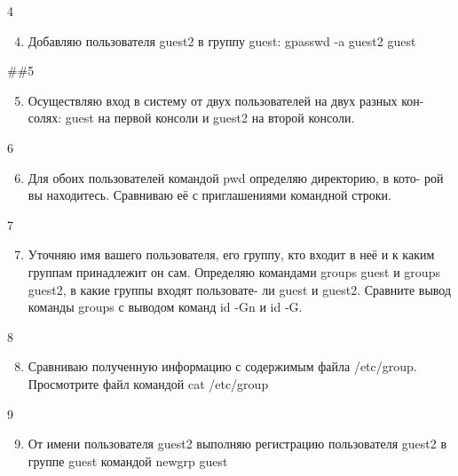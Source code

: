\documentclass[
  ignorenonframetext,
  aspectratio=169,
]{beamer}
\providecommand{\tightlist}{%
  \setlength{\itemsep}{0pt}\setlength{\parskip}{0pt}}\usepackage{longtable,booktabs,array}
\begin{document}
\begin{frame}{4}
\label{section-2}
\begin{enumerate}[<+->]
\setcounter{enumi}{3}
\tightlist
\item
  Добавляю пользователя guest2 в группу guest: gpasswd -a guest2 guest
\end{enumerate}

\#\#5

\begin{enumerate}[<+->]
\setcounter{enumi}{4}
\tightlist
\item
  Осуществляю вход в систему от двух пользователей на двух разных кон-
  солях: guest на первой консоли и guest2 на второй консоли.
\end{enumerate}
\end{frame}

\begin{frame}{6}
\label{section-3}
\begin{enumerate}[<+->]
\setcounter{enumi}{5}
\tightlist
\item
  Для обоих пользователей командой pwd определяю директорию, в кото- рой
  вы находитесь. Сравниваю её с приглашениями командной строки.
\end{enumerate}
\end{frame}

\begin{frame}{7}
\label{section-4}
\begin{enumerate}[<+->]
\setcounter{enumi}{6}
\tightlist
\item
  Уточняю имя вашего пользователя, его группу, кто входит в неё и к
  каким группам принадлежит он сам. Определяю командами groups guest и
  groups guest2, в какие группы входят пользовате- ли guest и guest2.
  Сравните вывод команды groups с выводом команд id -Gn и id -G.
\end{enumerate}
\end{frame}

\begin{frame}{8}
\label{section-5}
\begin{enumerate}[<+->]
\setcounter{enumi}{7}
\tightlist
\item
  Сравниваю полученную информацию с содержимым файла /etc/group.
  Просмотрите файл командой cat /etc/group
\end{enumerate}
\end{frame}

\begin{frame}{9}
\label{section-6}
\begin{enumerate}[<+->]
\setcounter{enumi}{8}
\tightlist
\item
  От имени пользователя guest2 выполняю регистрацию пользователя guest2
  в группе guest командой newgrp guest
\end{enumerate}
\end{frame}
\end{document}

